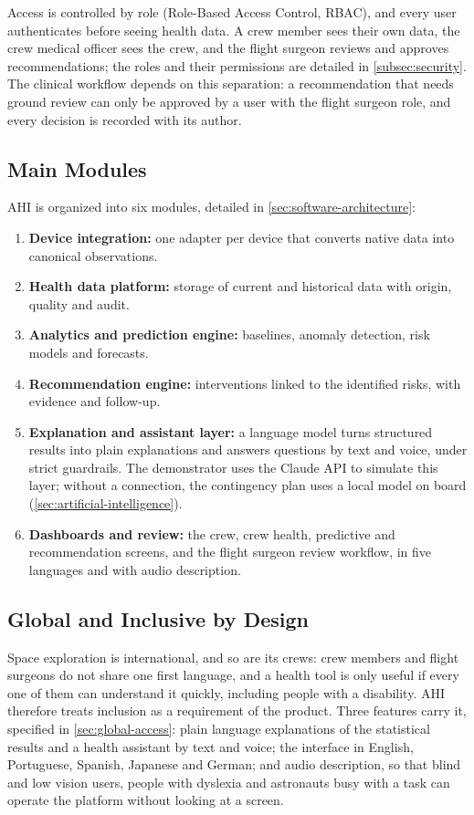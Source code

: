 Access is controlled by role (Role-Based Access Control, RBAC), and every user authenticates before seeing health data. A crew member sees their own data, the crew medical officer sees the crew, and the flight surgeon reviews and approves recommendations; the roles and their permissions are detailed in \ref{subsec:security}. The clinical workflow depends on this separation: a recommendation that needs ground review can only be approved by a user with the flight surgeon role, and every decision is recorded with its author.

\subsection{Main Modules}
\label{subsec:main-modules}

AHI is organized into six modules, detailed in \ref{sec:software-architecture}:

\begin{enumerate}
\item \textbf{Device integration:} one adapter per device that converts native data into canonical observations.
\item \textbf{Health data platform:} storage of current and historical data with origin, quality and audit.
\item \textbf{Analytics and prediction engine:} baselines, anomaly detection, risk models and forecasts.
\item \textbf{Recommendation engine:} interventions linked to the identified risks, with evidence and follow-up.
\item \textbf{Explanation and assistant layer:} a language model turns structured results into plain explanations and answers questions by text and voice, under strict guardrails. The demonstrator uses the Claude API to simulate this layer; without a connection, the contingency plan uses a local model on board (\ref{sec:artificial-intelligence}).
\item \textbf{Dashboards and review:} the crew, crew health, predictive and recommendation screens, and the flight surgeon review workflow, in five languages and with audio description.
\end{enumerate}

\subsection{Global and Inclusive by Design}
\label{subsec:inclusive}

Space exploration is international, and so are its crews: crew members and flight surgeons do not share one first language, and a health tool is only useful if every one of them can understand it quickly, including people with a disability. AHI therefore treats inclusion as a requirement of the product. Three features carry it, specified in \ref{sec:global-access}: plain language explanations of the statistical results and a health assistant by text and voice; the interface in English, Portuguese, Spanish, Japanese and German; and audio description, so that blind and low vision users, people with dyslexia and astronauts busy with a task can operate the platform without looking at a screen.

